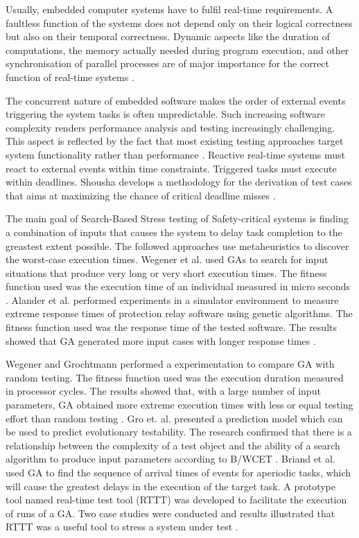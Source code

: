 \documentclass[espaco=umemeio,chapter=TITLE,twoside,openright]{abnt}
\begin{document}
Usually, embedded computer systems have to fulfil real-time requirements. A faultless function of the systems does not depend only on their logical correctness but also on their temporal correctness. Dynamic aspects like the duration of computations, the memory actually needed during program execution, and other synchronisation of parallel processes are of major importance for the correct function of real-time systems  \cite{J.WegenerK.GrimmM.GrochtmannH.Sthamer1996} .

The concurrent nature of embedded software makes  the order of external events triggering the system tasks is often unpredictable. Such increasing software complexity
renders performance analysis and testing increasingly
challenging. This aspect is reflected by the fact that most existing testing approaches target system functionality rather than performance \cite{DiAlesio2013}. Reactive real-time systems must react to external events within time constraints. Triggered tasks must execute within deadlines. Shousha develops a methodology for the derivation of test cases that aims at maximizing the chance of critical deadline misses \cite{shousha2003performance}.

The main goal of Search-Based Stress testing of Safety-critical systems is finding a combination of inputs that causes the system to delay task completion to the greastest extent possible. The followed approaches use metaheuristics to discover the worst-case execution times. Wegener et al. \cite{Wegener1997} used GAs to search for input situations that produce very long or very short execution times. The fitness function used was the execution time of an individual measured in micro seconds \cite{Wegener1997}. Alander et al. \cite{Alander} performed experiments in a simulator environment to measure extreme response times of protection relay software using genetic algorithms. The fitness function used was the response time of the tested software. The results showed that GA generated more input cases with longer response times \cite{Alander}.

Wegener and Grochtmann performed a  experimentation
to compare GA with random testing. The fitness function used was the execution duration measured in processor cycles.  The results showed that, with a large number of input parameters, GA obtained more extreme execution times with less or equal testing effort than random testing \cite{J.WegenerK.GrimmM.GrochtmannH.Sthamer1996} \cite{Wegener1998}. Gro et. al. \cite{Gross2000} presented a prediction model  which can be used to predict evolutionary testability. The research confirmed that there is a relationship between the complexity of a test object and the ability of a search algorithm to produce input parameters according to B/WCET \cite{Gross2000}. Briand et al. \cite{Briand2005} used GA to find the sequence of arrival times of events for aperiodic tasks, which will cause the greatest delays in the execution of the target task. A prototype tool named real-time test tool (RTTT) was developed to facilitate the execution of runs of a GA. Two case studies were conducted and results illustrated that RTTT was a useful tool to stress a system under test \cite{Briand2005}.
\end{document}
